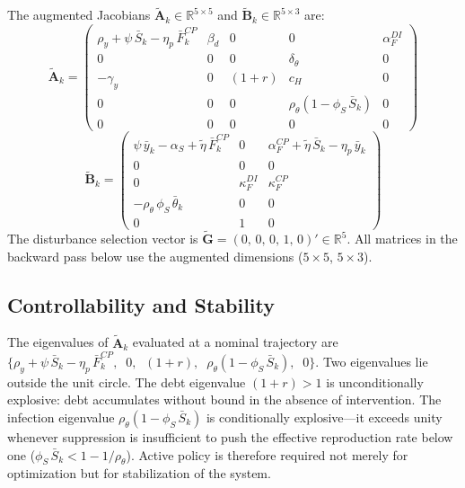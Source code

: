 \documentclass[12pt, a4paper]{article}
\begin{document}
The augmented Jacobians $\tilde{\bm{A}}_k \in \mathbb{R}^{5 \times 5}$ and
$\tilde{\bm{B}}_k \in \mathbb{R}^{5 \times 3}$ are:
%
\begin{equation}
\tilde{\bm{A}}_k = \begin{pmatrix}
\rho_y + \psi\,\bar{S}_k - \eta_p\,\bar{F}_k^{CP}
    & \beta_d & 0 & 0 & \alpha_F^{DI} \\[3pt]
0 & 0 & 0 & \delta_\theta & 0 \\[3pt]
-\gamma_y & 0 & (1+r) & c_H & 0 \\[3pt]
0 & 0 & 0 & \rho_\theta(1-\phi_S\,\bar{S}_k) & 0 \\[3pt]
0 & 0 & 0 & 0 & 0
\end{pmatrix}
\label{eq:Ak_aug}
\end{equation}
%
\begin{equation}
\tilde{\bm{B}}_k = \begin{pmatrix}
\psi\,\bar{y}_k - \alpha_S + \tilde{\eta}\,\bar{F}_k^{CP}
    & 0
    & \alpha_F^{CP} + \tilde{\eta}\,\bar{S}_k - \eta_p\,\bar{y}_k \\[3pt]
0 & 0 & 0 \\[3pt]
0 & \kappa_F^{DI} & \kappa_F^{CP} \\[3pt]
-\rho_\theta\,\phi_S\,\bar{\theta}_k & 0 & 0 \\[3pt]
0 & 1 & 0
\end{pmatrix}
\label{eq:Bk_aug}
\end{equation}
%
The disturbance selection vector is
$\tilde{\bm{G}} = (0,\, 0,\, 0,\, 1,\, 0)' \in \mathbb{R}^5$.
All matrices in the backward pass below use the augmented
dimensions ($5 \times 5$, $5 \times 3$).

\subsection{Controllability and Stability}
\label{app:controllability}

The eigenvalues of $\tilde{\bm{A}}_k$ evaluated at a nominal trajectory are
$\bigl\{\rho_y + \psi\,\bar{S}_k - \eta_p\,\bar{F}_k^{CP},\;\; 0,\;\;
(1+r),\;\; \rho_\theta(1-\phi_S\,\bar{S}_k),\;\; 0\bigr\}$. Two eigenvalues
lie outside the unit circle. The debt eigenvalue $(1+r) > 1$ is unconditionally
explosive: debt accumulates without bound in the absence of intervention. The
infection eigenvalue $\rho_\theta(1 - \phi_S\,\bar{S}_k)$ is conditionally
explosive---it exceeds unity whenever suppression is insufficient to push the
effective reproduction rate below one
($\phi_S\,\bar{S}_k < 1 - 1/\rho_\theta$). Active policy is therefore required
not merely for optimization but for stabilization of the system.
\end{document}
